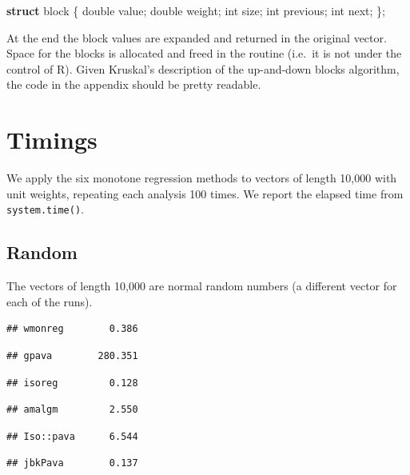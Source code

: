 \documentclass[12pt,]{article}
\newenvironment{Shaded}{\begin{snugshade}}{\end{snugshade}}
\newcommand{\KeywordTok}[1]{\textcolor[rgb]{0.13,0.29,0.53}{\textbf{#1}}}
\newcommand{\DataTypeTok}[1]{\textcolor[rgb]{0.13,0.29,0.53}{#1}}
\newcommand{\NormalTok}[1]{#1}
\begin{document}
\begin{Shaded}
\begin{Highlighting}[]
\KeywordTok{struct}\NormalTok{ block \{}
    \DataTypeTok{double}\NormalTok{ value;}
    \DataTypeTok{double}\NormalTok{ weight;}
    \DataTypeTok{int}\NormalTok{ size;}
    \DataTypeTok{int}\NormalTok{ previous;}
    \DataTypeTok{int}\NormalTok{ next;}
\NormalTok{\};}
\end{Highlighting}
\end{Shaded}

At the end the block values are expanded and returned in the original
vector. Space for the blocks is allocated and freed in the routine
(i.e.~it is not under the control of R). Given Kruskal's description of
the up-and-down blocks algorithm, the code in the appendix should be
pretty readable.

\section{Timings}\label{timings}

We apply the six monotone regression methods to vectors of length 10,000
with unit weights, repeating each analysis 100 times. We report the
elapsed time from \texttt{system.time()}.

\subsection{Random}\label{random}

The vectors of length 10,000 are normal random numbers (a different
vector for each of the runs).

\begin{verbatim}
## wmonreg        0.386
\end{verbatim}

\begin{verbatim}
## gpava        280.351
\end{verbatim}

\begin{verbatim}
## isoreg         0.128
\end{verbatim}

\begin{verbatim}
## amalgm         2.550
\end{verbatim}

\begin{verbatim}
## Iso::pava      6.544
\end{verbatim}

\begin{verbatim}
## jbkPava        0.137
\end{verbatim}
\end{document}
